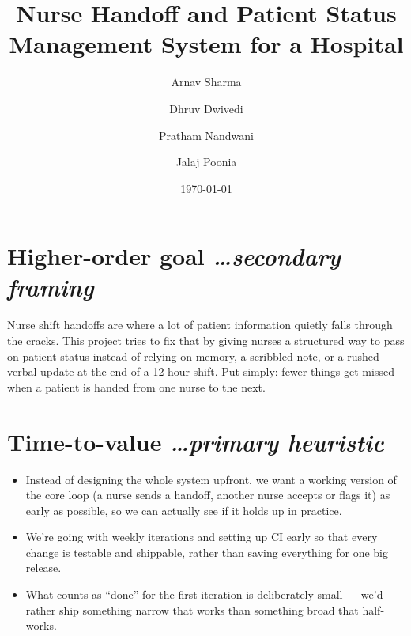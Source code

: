 \documentclass[11pt,a4paper]{article}
\title{Nurse Handoff and Patient Status Management System for a Hospital}
\author{
  Arnav Sharma%
  \and
  Dhruv Dwivedi%
  \and
  Pratham Nandwani%
  \and
  Jalaj Poonia%
}
\date{\today}
\newcommand{\BvrHint}[1]{%
  {\normalfont\normalsize\itshape\hfill #1}}
\begin{document}
\maketitle

\section{Higher-order goal%
  \BvrHint{\ldots secondary framing}}
Nurse shift handoffs are where a lot of patient information
quietly falls through the cracks. This project tries to fix
that by giving nurses a structured way to pass on patient
status instead of relying on memory, a scribbled note, or a
rushed verbal update at the end of a 12-hour shift. Put
simply: fewer things get missed when a patient is handed from
one nurse to the next.

\section{Time-to-value %
\BvrHint{\ldots primary heuristic}}
\begin{itemize}[leftmargin=0.7cm]
    \item Instead of designing the whole system upfront, we want a working version of the core loop (a nurse sends a handoff, another nurse accepts or flags it) as early as possible, so we can actually see if it holds up in practice.
    \item We're going with weekly iterations and setting up CI early so that every change is testable and shippable, rather than saving everything for one big release.
    \item What counts as ``done'' for the first iteration is deliberately small --- we'd rather ship something narrow that works than something broad that half-works.
\end{itemize}
\end{document}
